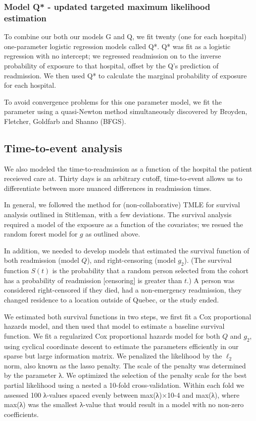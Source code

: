 \documentclass[]{article}\usepackage[]{graphicx}\usepackage[]{color}
\begin{document}
\subsubsection{Model Q* - updated targeted maximum likelihood estimation}
To combine our both our models G and Q, we fit twenty (one for each hospital) one-parameter logistic regression models called Q*. Q* was fit as a logistic regression with no intercept; we regressed readmission on to the inverse probability of exposure to that hospital, offset by the Q's prediction of readmission. We then used Q* to calculate the marginal probability of exposure for each hospital.

To avoid convergence problems for this one parameter model, we fit the parameter using a quasi-Newton method simultaneously discovered by Broyden\supercite{broyden_convergence_1970}, Fletcher\supercite{fletcher_new_1970}, Goldfarb\supercite{goldfarb_family_1970} and Shanno\supercite{shanno_conditioning_1970} (BFGS).

\subsection{Time-to-event analysis}
We also modeled the time-to-readmission as a function of the hospital the patient receieved care at. Thirty days is an arbitrary cutoff, time-to-event allows us to differentiate between more nuanced differences in readmission times.

In general, we followed the method for (non-collaborative) TMLE for survival analysis outlined in Stitleman, with a few deviations. The survival analysis required a model of the exposure as a function of the covariates; we resued the random forest model for $g$ as outlined above.

In addition, we needed to develop models that estimated the survival function of both readmission (model $Q$), and right-censoring (model $g_2$). (The survival function $S(t)$ is the probability that a random person selected from the cohort has a probability of readmission [censoring] is greater than $t$.) A person was considered right-censored if they died, had a non-emergency readmission, they changed residence to a location outside of Quebec, or the study ended. 

We estimated both survival functions in two steps, we first fit a Cox proportional hazards model, and then used that model to estimate a baseline survival function.  We fit a regularized Cox proportional hazards model for both \(Q\) and \(g_2\), using cyclical coordinate descent to estimate the parameters efficiently in our sparse but large information matrix. We penalized the likelihood by the \(\ell_2\) norm, also known as the lasso penalty. The scale of the penalty was determined by the parameter λ. We optimized the selection of the penalty scale for the best partial likelihood using a nested a 10-fold cross-validation. Within each fold we assessed 100 λ-values spaced evenly between max(λ)×10-4 and max(λ), where max(λ) was the smallest λ-value that would result in a model with no non-zero coefficients.
\end{document}
